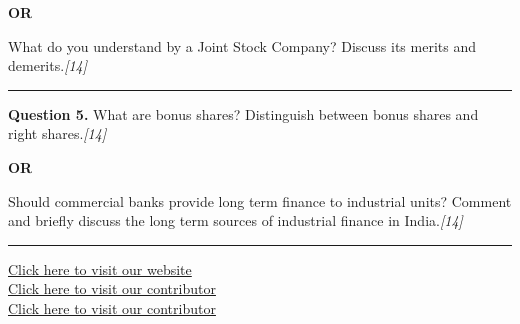 \documentclass[11pt,a4paper]{article}
\newcommand{\pts}[1]{\hfill   \textit{[#1]}}
\begin{document}
\centerline{   \textbf{OR}}

What do you understand by a Joint Stock Company? Discuss its merits and demerits.\pts{14}

\medskip\rule{\linewidth}{0.2pt}




\noindent   \textbf{Question 5.}
What are bonus shares? Distinguish between bonus shares and right shares.\pts{14}

\centerline{   \textbf{OR}}

Should commercial banks provide long term finance to industrial units? Comment and briefly discuss the long term sources of industrial finance in India.\pts{14}

\vfill
\rule{\linewidth}{0.4pt}

\begin{center}\small
\href{https://bhu-exam.vercel.app/}{Click here to visit our website}\\[4pt]
\href{https://me-aryan.vercel.app/}{Click here to visit our contributor}\\[4pt]
\href{https://quashan-me.vercel.app/}{Click here to visit our contributor}
\end{center}
\end{document}
